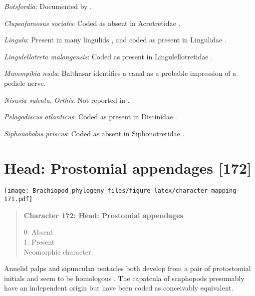 \documentclass[openany]{book}
\theoremstyle{definition}
\theoremstyle{definition}
\theoremstyle{definition}
\theoremstyle{remark}
\begin{document}
\hypertarget{Botsfordia-coding-171}{}
\emph{Botsfordia}: Documented by \citet{Skovsted2017Depthrelated}.

\hypertarget{Clupeafumosus_socialis-coding-171}{}
\emph{Clupeafumosus socialis}: Coded as absent in Acrotretidae
\citep[table 6]{Williams2000LinguliformeaCraniiformea}.

\hypertarget{Lingula-coding-171}{}
\emph{Lingula}: Present in many lingulids
\citep{Williams2000LinguliformeaCraniiformea}, and coded as present in
Lingulidae \citep[table 6]{Williams2000LinguliformeaCraniiformea}.

\hypertarget{Lingulellotreta_malongensis-coding-171}{}
\emph{Lingulellotreta malongensis}: Coded as present in
Lingulellotretidae \citep[table
6]{Williams2000LinguliformeaCraniiformea}.

\hypertarget{Mummpikia_nuda-coding-171}{}
\emph{Mummpikia nuda}: Balthasar
\citeyearpar[p.~274]{Balthasar2008iMummpikia} identifies a canal as a
probable impression of a pedicle nerve.

\hypertarget{Nisusia_sulcata-coding-171}{}
\emph{Nisusia sulcata}, \emph{Orthis}: Not reported in
\citet{Williams2000LinguliformeaCraniiformea}.

\hypertarget{Pelagodiscus_atlanticus-coding-171}{}
\emph{Pelagodiscus atlanticus}: Coded as present in Discinidae
\citep[table 6]{Williams2000LinguliformeaCraniiformea}.

\hypertarget{Siphonobolus_priscus-coding-171}{}
\emph{Siphonobolus priscus}: Coded as absent in Siphonotretidae
\citep[table 6]{Williams2000LinguliformeaCraniiformea}.

\section{Head: Prostomial appendages
{[}172{]}}\label{head-prostomial-appendages-172}

\texttt{[image: Brachiopod\_phylogeny\_files/figure-latex/character-mapping-171.pdf]}

\begin{quote}
\textbf{Character 172: Head: Prostomial appendages}

0: Absent\\
1: Present\\
Neomorphic character.
\end{quote}

Annelid palps and sipunculan tentacles both develop from a pair of
protostomial initials and seem to be homologous \citep{Adrianov2005}.
The capatcula of scaphopods presumably have an independent origin but
have been coded as conceivably equivalent.
\end{document}
